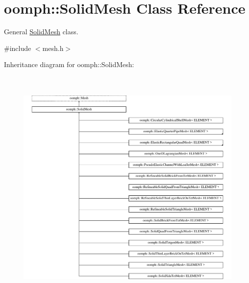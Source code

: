 \hypertarget{classoomph_1_1SolidMesh}{}\section{oomph\+:\+:Solid\+Mesh Class Reference}
\label{classoomph_1_1SolidMesh}


General \hyperlink{classoomph_1_1SolidMesh}{Solid\+Mesh} class.  




{\ttfamily \#include $<$mesh.\+h$>$}

Inheritance diagram for oomph\+:\+:Solid\+Mesh\+:\begin{figure}[H]
\begin{center}
\leavevmode
\includegraphics[height=12.000000cm]{classoomph_1_1SolidMesh}
\end{center}
\end{figure}
